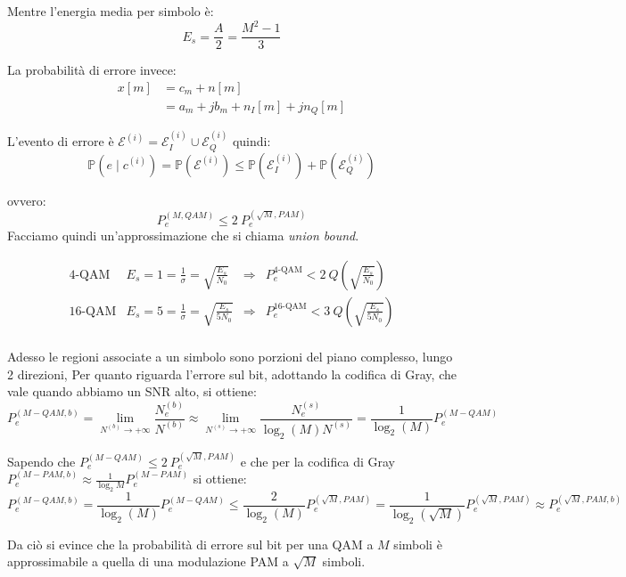 Mentre l'energia media per simbolo è:
\[
    E_s = \frac{A}{2} = \frac{M^2 - 1}{3}
\]

La probabilità di errore invece:
\begin{align*}
    x\left[ m \right] & = c_m + n \left[ m \right]                                    \\
                      & = a_m + j b_m + n_I \left[ m \right] + j n_Q \left[ m \right]
\end{align*}


L'evento di errore è $\mathcal{E}^{(i)} = \mathcal{E}_I^{(i)} \cup \mathcal{E}_Q^{(i)}$ quindi:
\[
    \mathbb{P} \left( e \mid c^{(i)} \right) = \mathbb{P} \left( \mathcal{E}^{(i)} \right) \leq \mathbb{P} \left( \mathcal{E}_I^{(i)} \right) + \mathbb{P} \left( \mathcal{E}_Q^{(i)} \right)
\]

ovvero:
\[
    P_e^{(M, QAM)} \leq 2 \ P_e^{(\sqrt{M}, PAM)}
\]
Facciamo quindi un'approssimazione che si chiama \textit{union bound}.




\[
    \begin{array}{ccccc}
        \text{4-QAM}  & E_s = 1 = \frac{1}{\sigma} = \sqrt{\frac{E_s}{N_0}}  & \Rightarrow & P_e^{\text{4-QAM}} < 2 \ Q\left(\sqrt{\frac{E_s}{N_0}}\right)   \\
        \text{16-QAM} & E_s = 5 = \frac{1}{\sigma} = \sqrt{\frac{E_s}{5N_0}} & \Rightarrow & P_e^{\text{16-QAM}} < 3 \ Q\left(\sqrt{\frac{E_s}{5N_0}}\right) \\
    \end{array}
\]

Adesso le regioni associate a un simbolo sono porzioni del piano complesso, lungo 2 direzioni,
Per quanto riguarda l'errore sul bit, adottando la codifica di Gray, che vale quando abbiamo un SNR alto, si ottiene:
\[
    P_e^{(M-QAM, b)} = \lim_{N^{(b)} \to +\infty} \frac{N_e^{(b)}}{N^{(b)}} \approx \lim_{N^{(s)} \to +\infty} \frac{N_e^{(s)}}{\log_2(M) N^{(s)}} = \frac{1}{\log_2(M)} P_e^{(M-QAM)}
\]

Sapendo che $P_e^{(M-QAM)} \leq 2 \ P_e^{(\sqrt{M}, PAM)}$ e che per la codifica di Gray $P_e^{(M-PAM, b)} \approx \frac{1}{\log_2{M}} P_e^{(M-PAM)}$ si ottiene:
\[
    P_e^{(M-QAM, b)} = \frac{1}{\log_2(M)} P_e^{(M-QAM)} \leq \frac{2}{\log_2(M)} P_e^{(\sqrt{M}, PAM)} = \frac{1}{\log_2(\sqrt{M})} P_e^{(\sqrt{M}, PAM)} \approx P_e^{(\sqrt{M}, PAM, b)}
\]

Da ciò si evince che la probabilità di errore sul bit per una QAM a $M$ simboli è approssimabile a quella di una modulazione PAM a $\sqrt{M}$ simboli.

